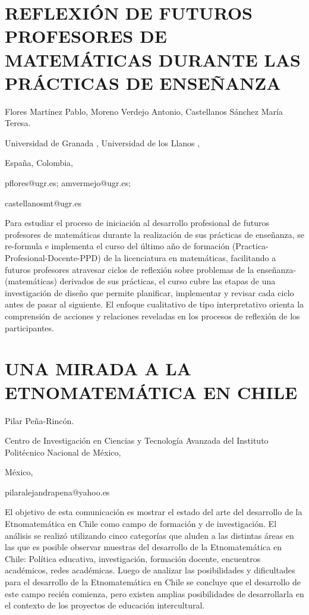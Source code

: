 \section{REFLEXIÓN DE FUTUROS PROFESORES DE MATEMÁTICAS DURANTE LAS PRÁCTICAS
DE ENSEÑANZA}

\begin{datos}

Flores Martínez Pablo, Moreno Verdejo Antonio, Castellanos Sánchez
María Teresa.

Universidad de Granada , Universidad de los Llanos ,

España, Colombia,

pflores@ugr.es; amvermejo@ugr.es;

castellanosmt@ugr.es 

\end{datos}

Para estudiar el proceso de iniciación al desarrollo profesional de
futuros profesores de matemáticas durante la realización de sus prácticas
de enseñanza, se re-formula e implementa el curso del último año de
formación (Practica-Profesional-Docente-PPD) de la licenciatura en
matemáticas, facilitando a futuros profesores atravesar ciclos de
reflexión sobre problemas de la enseñanza-(matemáticas) derivados
de sus prácticas, el curso cubre las etapas de una investigación de
diseño que permite planificar, implementar y revisar cada ciclo antes
de pasar al siguiente. El enfoque cualitativo de tipo interpretativo
orienta la comprensión de acciones y relaciones reveladas en los procesos
de reflexión de los participantes.


\section{UNA MIRADA A LA ETNOMATEMÁTICA EN CHILE}

\begin{datos}

Pilar Peña-Rincón.

Centro de Investigación en Ciencias y Tecnología Avanzada del Instituto
Politécnico Nacional de México,

México,

pilaralejandrapena@yahoo.es 

\end{datos}

El objetivo de esta comunicación es mostrar el estado del arte del
desarrollo de la Etnomatemática en Chile como campo de formación y
de investigación. El análisis se realizó utilizando cinco categorías
que aluden a las distintas áreas en las que es posible observar muestras
del desarrollo de la Etnomatemática en Chile: Política educativa,
investigación, formación docente, encuentros académicos, redes académicas.
Luego de analizar las posibilidades y dificultades para el desarrollo
de la Etnomatemática en Chile se concluye que el desarrollo de este
campo recién comienza, pero existen amplias posibilidades de desarrollarla
en el contexto de los proyectos de educación intercultural. 


